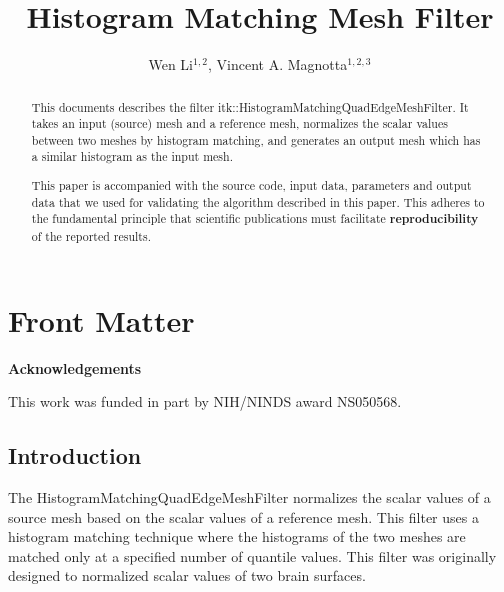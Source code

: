 \documentclass{InsightArticle}
\title{Histogram Matching Mesh Filter}
\author{Wen Li$^{1,2}$, Vincent A. Magnotta$^{1,2,3}$}
\makeatletter
\newcommand\ackname{Acknowledgements}
\newenvironment{acknowledgements}{%
      \titlepage
      \null\vfil
      \@beginparpenalty\@lowpenalty
      \begin{center}%
        \bfseries \ackname
        \@endparpenalty\@M
      \end{center}}%
     {\par\vfil\null\endtitlepage}
\newenvironment{acknowledgements}{%
      \if@twocolumn
        \section*{\abstractname}%
      \else
        \small
        \begin{center}%
          {\bfseries \ackname\vspace{-.5em}\vspace{\z@}}%
        \end{center}%
        \quotation
      \fi}
      {\if@twocolumn\else\endquotation\fi}
\newcommand{\IJhandlerIDnumber}{3117}
\makeatother
\begin{document}
%
% 
\IJhandlefooter{\IJhandlerIDnumber}


\ifpdf
\else
\fi


\maketitle


\ifhtml
\chapter*{Front Matter\label{front}}
\fi

\begin{abstract}
 
This documents describes the filter itk::HistogramMatchingQuadEdgeMeshFilter.  It
takes an input (source) mesh and a reference mesh, normalizes the scalar values 
between two meshes by histogram matching, and generates an output mesh 
which has a similar histogram as the input mesh.

This paper is accompanied with the source code, input data, parameters and
output data that we used for validating the algorithm described in this paper.
This adheres to the fundamental principle that scientific publications must
facilitate \textbf{reproducibility} of the reported results.
\end{abstract}

\begin{acknowledgements}
This work was funded in part by NIH/NINDS award NS050568.
\end{acknowledgements}

\tableofcontents

\section{Introduction}

The HistogramMatchingQuadEdgeMeshFilter normalizes the scalar values of a source
mesh based on the scalar values of a reference mesh. 
This filter uses a histogram matching technique where the histograms of the 
two meshes are matched only at a specified number of quantile values.
This filter was originally designed to normalized scalar values of two
brain surfaces. 
\end{document}
